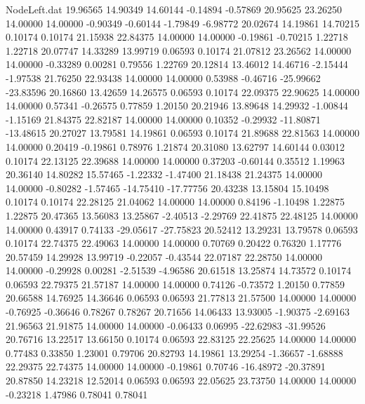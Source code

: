 \begin{filecontents}{NodeLeft.dat}
  19.96565   14.90349   14.60144    -0.14894   -0.57869   20.95625   23.26250   14.00000   14.00000   -0.90349   -0.60144   -1.79849   -6.98772
  20.02674   14.19861   14.70215     0.10174    0.10174   21.15938   22.84375   14.00000   14.00000   -0.19861   -0.70215    1.22718    1.22718
  20.07747   14.33289   13.99719     0.06593    0.10174   21.07812   23.26562   14.00000   14.00000   -0.33289    0.00281    0.79556    1.22769
  20.12814   13.46012   14.46716    -2.15444   -1.97538   21.76250   22.93438   14.00000   14.00000    0.53988   -0.46716  -25.99662  -23.83596
  20.16860   13.42659   14.26575     0.06593    0.10174   22.09375   22.90625   14.00000   14.00000    0.57341   -0.26575    0.77859    1.20150
  20.21946   13.89648   14.29932    -1.00844   -1.15169   21.84375   22.82187   14.00000   14.00000    0.10352   -0.29932  -11.80871  -13.48615
  20.27027   13.79581   14.19861     0.06593    0.10174   21.89688   22.81563   14.00000   14.00000    0.20419   -0.19861    0.78976    1.21874
  20.31080   13.62797   14.60144     0.03012    0.10174   22.13125   22.39688   14.00000   14.00000    0.37203   -0.60144    0.35512    1.19963
  20.36140   14.80282   15.57465    -1.22332   -1.47400   21.18438   21.24375   14.00000   14.00000   -0.80282   -1.57465  -14.75410  -17.77756
  20.43238   13.15804   15.10498     0.10174    0.10174   22.28125   21.04062   14.00000   14.00000    0.84196   -1.10498    1.22875    1.22875
  20.47365   13.56083   13.25867    -2.40513   -2.29769   22.41875   22.48125   14.00000   14.00000    0.43917    0.74133  -29.05617  -27.75823
  20.52412   13.29231   13.79578     0.06593    0.10174   22.74375   22.49063   14.00000   14.00000    0.70769    0.20422    0.76320    1.17776
  20.57459   14.29928   13.99719    -0.22057   -0.43544   22.07187   22.28750   14.00000   14.00000   -0.29928    0.00281   -2.51539   -4.96586
  20.61518   13.25874   14.73572     0.10174    0.06593   22.79375   21.57187   14.00000   14.00000    0.74126   -0.73572    1.20150    0.77859
  20.66588   14.76925   14.36646     0.06593    0.06593   21.77813   21.57500   14.00000   14.00000   -0.76925   -0.36646    0.78267    0.78267
  20.71656   14.06433   13.93005    -1.90375   -2.69163   21.96563   21.91875   14.00000   14.00000   -0.06433    0.06995  -22.62983  -31.99526
  20.76716   13.22517   13.66150     0.10174    0.06593   22.83125   22.25625   14.00000   14.00000    0.77483    0.33850    1.23001    0.79706
  20.82793   14.19861   13.29254    -1.36657   -1.68888   22.29375   22.74375   14.00000   14.00000   -0.19861    0.70746  -16.48972  -20.37891
  20.87850   14.23218   12.52014     0.06593    0.06593   22.05625   23.73750   14.00000   14.00000   -0.23218    1.47986    0.78041    0.78041

\end{filecontents}
